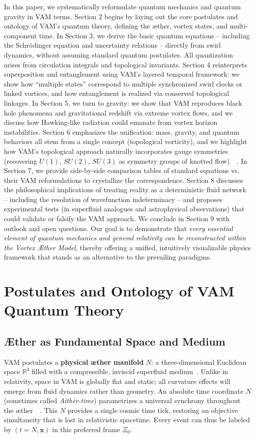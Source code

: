 \documentclass[preprint]{revtex4-2}
\begin{document}
    In this paper, we systematically reformulate quantum mechanics and quantum gravity in VAM terms. Section 2 begins by laying out the core postulates and ontology of VAM’s quantum theory, defining the æther, vortex states, and multi-component time. In Section 3, we derive the basic quantum equations -- including the Schrödinger equation and uncertainty relations -- directly from swirl dynamics, without assuming standard quantum postulates. All quantization arises from circulation integrals and topological invariants. Section 4 reinterprets superposition and entanglement using VAM’s layered temporal framework: we show how “multiple states” correspond to multiple synchronized swirl clocks or linked vortices, and how entanglement is realized via conserved topological linkages. In Section 5, we turn to gravity: we show that VAM reproduces black hole phenomena and gravitational redshift via extreme vortex flows, and we discuss how Hawking-like radiation could emanate from vortex horizon instabilities. Section 6 emphasizes the unification: mass, gravity, and quantum behaviors all stem from a single concept (topological vorticity), and we highlight how VAM’s topological approach naturally incorporates gauge symmetries (recovering $U(1)$, $SU(2)$, $SU(3)$ as symmetry groups of knotted flow)~\cite{reference_12}~\cite{reference_13}. In Section 7, we provide side-by-side comparison tables of standard equations vs. their VAM reformulations to crystallize the correspondence. Section 8 discusses the philosophical implications of treating reality as a deterministic fluid network -- including the resolution of wavefunction indeterminacy -- and proposes experimental tests (in superfluid analogues and astrophysical observations) that could validate or falsify the VAM approach. We conclude in Section 9 with outlook and open questions. Our goal is to demonstrate that \emph{every essential element of quantum mechanics and general relativity can be reconstructed within the Vortex Æther Model}, thereby offering a unified, intuitively visualizable physics framework that stands as an alternative to the prevailing paradigms.

\section{Postulates and Ontology of VAM Quantum Theory}
    \subsection{Æther as Fundamental Space and Medium}
    VAM postulates a \textbf{physical æther manifold} $N$: a three-dimensional Euclidean space $\mathbb{R}^3$ filled with a compressible, inviscid superfluid medium~\cite{reference_14}. Unlike in relativity, space in VAM is globally flat and static; all curvature effects will emerge from fluid dynamics rather than geometry. An absolute time coordinate $N$ (sometimes called \emph{Aithēr-time}) parametrizes a universal synchrony throughout the æther~~\cite{reference_15,reference_16}. This $N$ provides a single cosmic time tick, restoring an objective simultaneity that is lost in relativistic spacetime. Every event can thus be labeled by $(t=N, \mathbf{x})$ in this preferred frame $\Xi_0$.
\end{document}
